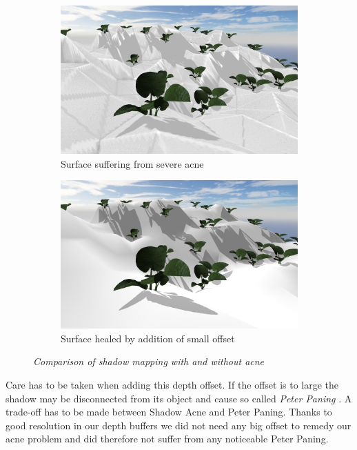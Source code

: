 \begin{figure}[H]
\begin{subfigure}{.5\textwidth}
  \centering
  \includegraphics[width=0.9\linewidth]{images/SMAcne.png}
  \caption{Surface suffering from severe acne}
  \label{fig:SMAcne}
\end{subfigure}%
\begin{subfigure}{.5\textwidth}
  \centering
  \includegraphics[width=0.9\linewidth]{images/SMAcneFix.png}
  \caption{Surface healed by addition of small offset}
  \label{fig:SMAcneFix}
\end{subfigure}
\caption[Shadow mapping, acne comparison]{\textit{Comparison of shadow mapping with and without acne}}
\label{fig:AcneComparison}
\end{figure}

Care has to be taken when adding this depth offset. If the offset is to large the shadow may be disconnected from its object and cause so called \textit{Peter Paning} \cite{ImprovedShadowMapping}. A trade-off has to be made between Shadow Acne and Peter Paning. Thanks to good resolution in our depth buffers we did not need any big offset to remedy our acne problem and did therefore not suffer from any noticeable Peter Paning. 

